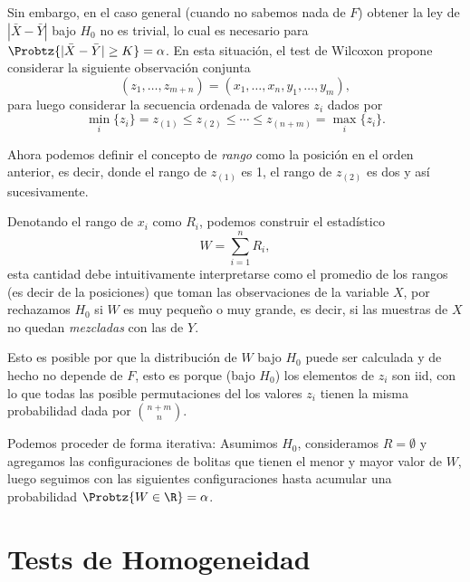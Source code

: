 Sin embargo, en el caso general (cuando no sabemos nada de $F$) obtener la ley de $|\bar{X} - \bar{Y}|$ bajo $H_0$ no es trivial, lo cual es necesario para $\Probtz{|\bar{X} - \bar{Y}|\geq K} = \alpha$. En esta situación, el test de Wilcoxon propone considerar la siguiente observación conjunta 
\begin{equation}
	(z_1,\ldots,z_{m+n}) = (x_1,\ldots,x_n,y_1,\ldots,y_m),
\end{equation}
para luego considerar la secuencia ordenada de valores $z_i$ dados por 
\begin{equation}
	\min_i\{z_i\} = z_{(1)}\leq z_{(2)}\leq\cdots\leq z_{(n+m)} = \max_i\{z_i\}.
\end{equation}

Ahora podemos definir el concepto de \emph{rango} como la posición en el orden anterior, es decir, donde el rango de $z_{(1)}$ es 1, el rango de $z_{(2)}$ es dos  y así sucesivamente. 


Denotando el rango de $x_i$ como $R_i$, podemos construir el estadístico
\begin{equation}
 	W = \sum_{i=1}^{n}R_i,
 \end{equation} 
esta cantidad debe intuitivamente interpretarse como el promedio de los rangos (es decir de la posiciones) que toman las observaciones de la variable $X$, por rechazamos $H_0$ si $W$ es muy pequeño o muy grande, es decir, si las muestras de $X$ no quedan \emph{mezcladas} con las de $Y$. 

 Esto es posible por que la distribución de $W$ bajo $H_0$ puede ser calculada y de hecho no depende de $F$, esto es porque (bajo $H_0$) los elementos de $z_i$ son iid, con lo que todas las posible permutaciones del los valores $z_i$ tienen la misma probabilidad dada por $\binom{n+m}{n}$.

 \begin{remark}
 	Podemos proceder de forma iterativa: Asumimos $H_0$, consideramos $R=\emptyset$ y agregamos las configuraciones de bolitas que tienen el menor y mayor valor de $W$, luego seguimos con las siguientes configuraciones hasta acumular una probabilidad $\Probtz{W\in\R} = \alpha$.
 \end{remark}
 
\section{Tests de Homogeneidad}

